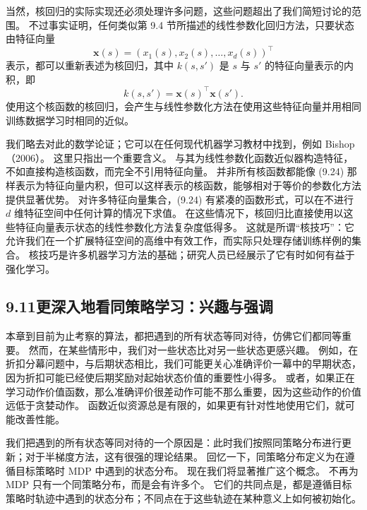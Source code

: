\documentclass[UTF8, 12pt, fontset=fandol, oneside]{ctexart}
\begin{document}
当然，核回归的实际实现还必须处理许多问题，这些问题超出了我们简短讨论的范围。
不过事实证明，任何类似第 9.4 节所描述的线性参数化回归方法，只要状态由特征向量
\[
\mathbf{x}(s)=(x_1(s),x_2(s),\ldots,x_d(s))^\top
\]
表示，都可以重新表述为核回归，其中 $k(s,s')$ 是 $s$ 与 $s'$ 的特征向量表示的内积，即
\begin{equation}
k(s,s')=\mathbf{x}(s)^\top\mathbf{x}(s').
\tag{9.24}
\end{equation}
使用这个核函数的核回归，会产生与线性参数化方法在使用这些特征向量并用相同训练数据学习时相同的近似。

我们略去对此的数学论证；它可以在任何现代机器学习教材中找到，例如 Bishop（2006）。
这里只指出一个重要含义。
与其为线性参数化函数近似器构造特征，不如直接构造核函数，而完全不引用特征向量。
并非所有核函数都能像 (9.24) 那样表示为特征向量内积，但可以这样表示的核函数，能够相对于等价的参数化方法提供显著优势。
对许多特征向量集合，(9.24) 有紧凑的函数形式，可以在不进行 $d$ 维特征空间中任何计算的情况下求值。
在这些情况下，核回归比直接使用以这些特征向量表示状态的线性参数化方法复杂度低得多。
这就是所谓“核技巧”：它允许我们在一个扩展特征空间的高维中有效工作，而实际只处理存储训练样例的集合。
核技巧是许多机器学习方法的基础；研究人员已经展示了它有时如何有益于强化学习。

\subsection*{9.11\quad 更深入地看同策略学习：兴趣与强调}

本章到目前为止考察的算法，都把遇到的所有状态等同对待，仿佛它们都同等重要。
然而，在某些情形中，我们对一些状态比对另一些状态更感兴趣。
例如，在折扣分幕问题中，与后期状态相比，我们可能更关心准确评价一幕中的早期状态，因为折扣可能已经使后期奖励对起始状态价值的重要性小得多。
或者，如果正在学习动作价值函数，那么准确评价很差动作可能不那么重要，因为这些动作的价值远低于贪婪动作。
函数近似资源总是有限的，如果更有针对性地使用它们，就可能改善性能。

我们把遇到的所有状态等同对待的一个原因是：此时我们按照同策略分布进行更新；对于半梯度方法，这有很强的理论结果。
回忆一下，同策略分布定义为在遵循目标策略时 MDP 中遇到的状态分布。
现在我们将显著推广这个概念。
不再为 MDP 只有一个同策略分布，而是会有许多个。
它们的共同点是，都是遵循目标策略时轨迹中遇到的状态分布；不同点在于这些轨迹在某种意义上如何被初始化。
\end{document}
